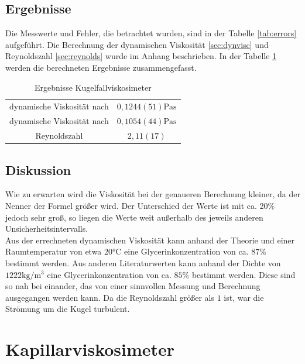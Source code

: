 \documentclass[11pt, a4paper]{article}
\begin{document}
    \subsection{Ergebnisse}

    Die Messwerte und Fehler, die betrachtet wurden, sind in der Tabelle \ref{tab:errors} aufgeführt. Die Berechnung der dynamischen Viskosität \ref{sec:dynvisc} und Reynoldszahl \ref{sec:reynolds}
    wurde im Anhang beschrieben. In der Tabelle \ref{tab:results1} werden die berechneten Ergebnisse zusammengefasst.
    \begin{table}[H]
        \centering
        \begin{tabular}{c c}
            dynamische Viskosität nach \cite[(11)]{VIS} & $0,1244(51) \si{\pascal\second}$ \\
            dynamische Viskosität nach \cite[(12)]{VIS} & $0,1054(44) \si{\pascal\second}$ \\
            Reynoldszahl & $2,11(17)$ \\
        \end{tabular}
        \caption{Ergebnisse Kugelfallviskosimeter}
        \label{tab:results1}
    \end{table}
    

    \subsection{Diskussion}
    Wie zu erwarten wird die Viskosität bei der genaueren Berechnung kleiner, da der Nenner der Formel
    größer wird. Der Unterschied der Werte ist mit ca. 20\% jedoch sehr groß, so liegen die Werte
    weit außerhalb des jeweils anderen Unsicherheitsintervalls. \\
    Aus der errechneten dynamischen Viskosität kann anhand der Theorie \cite[Abbildung 8]{VIS} und einer Raumtemperatur von etwa $20 \si{\celsius}$ 
    eine Glycerinkonzentration von ca. $87\%$ bestimmt werden. Aus anderen Literaturwerten \cite{GLY} kann anhand der Dichte von $1222 \si{\kilogram\per\meter\cubed}$
    eine Glycerinkonzentration von ca. $85\%$ bestimmt werden. Diese sind so nah bei einander, das von einer
    sinnvollen Messung und Berechnung ausgegangen werden kann. Da die Reynoldszahl größer als $1$ ist, 
    war die Strömung um die Kugel turbulent.

    \section{Kapillarviskosimeter}
\end{document}

